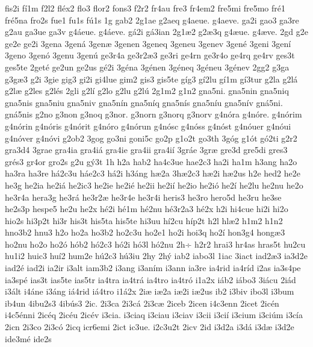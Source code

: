 {fis2i
f^^ed1m
f2l2
fl^^e9x2
flo3
flor2
fons3
f2r2
fr4au
fre3
fr4em2
fre5mi
fre5mo
fr^^e91
fr^^e95na
fro2s
fue1
fu1s
f^^fa1s
1g
gab2
2g1ae
g2aeq
g4aeue.
g4aeve.
ga2i
gao3
ga3re
g2au
ga3ue
ga3v
g4^^e1eue.
g4^^e1eve.
g^^e12i
g^^e13ian
2g1^^e62
g2^^e63q
g4^^e6ue.
g4^^e6ve.
2gd
g2e
ge2e
ge2i
3gena
3gen^^e1
3gen^^e6
3genen
3geneq
3geneu
3genev
3gen^^e9
3geni
3gen^^ed
3geno
3gen^^f3
3genu
3gen^^fa
ge3r4a
ge3r2^^e63
ge3ri
ge4rn
ge3r4o
ge4rq
ge4rv
ges3t
ges5te
2get^^e9
ge2un
ge2us
g^^e92i
3g^^e9na
3g^^e9nen
3g^^e9neq
3g^^e9neu
3g^^e9nev
2gg2
g3ga
g3g^^e63
g2i
3gie
gig3
gi2i
gi4lue
gim2
gis3
gis5te
g^^edg3
g^^ed2lu
g^^ed1m
g^^ed3tur
g2la
g2l^^e1
g2l^^e6
g2les
g2l^^e9s
2gli
g2l^^ed
g2lo
g2lu
g2l^^fa
2g1m2
g1n2
gna5ni.
gna5nin
gna5niq
gna5nis
gna5niu
gna5niv
gna5n^^edn
gna5n^^edq
gna5n^^eds
gna5n^^edu
gna5n^^edv
gn^^e15ni.
gn^^e15nis
g2no
g3non
g3noq
g3nor.
g3norn
g3norq
g3norv
g4n^^f3ra
g4n^^f3re.
g4n^^f3rim
g4n^^f3rin
g4n^^f3ris
g4n^^f3rit
g4n^^f3ro
g4n^^f3run
g4n^^f3sc
g4n^^f3ss
g4n^^f3st
g4n^^f3uer
g4n^^f3ui
g4n^^f3ver
g4n^^f3vi
g2ob2
3gog
go3ni
goni5c
go2p
g1o2t
go3th
3g^^f3g
g1^^f3t
g^^f32ti
g2r2
gra3d4
3grae
gra4ia
gra4i^^e1
gra4ie
gra4ii
gra4i^^ed
3gr^^e1e
3gr^^e6
gre3d
gre5di
gres3
gr^^e9s3
gr4or
gro2s
g2u
g^^fd3t
1h
h2a
hab2
ha4c3ue
hae2c3
ha2i
ha1m
h3ang
ha2o
ha3ra
ha3re
h^^e12c3u
h^^e1e2c3
h^^e12i
h3^^e1ng
h^^e62a
3h^^e62c3
h^^e62i
h^^e62us
h2e
hed2
he2e
he3g
he2ia
he2i^^e1
he2ic3
he2ie
he2i^^e9
he2ii
he2i^^ed
he2io
he2i^^f3
he2^^ed
he2lu
he2nu
he2o
he3r4a
hera3g
he3r^^e1
he3r2^^e6
he3r4e
he3r4i
heris3
he3ro
hero5d
he3ru
he3se
he2s3p
hespe5
he2u
he2x
h^^e92i
h^^e91m
h^^e92nu
h^^e93r2a3
h^^e92x
h2i
hi4cue
hi2i
hi2o
hio2s
hi3p2t
hi3r
his3t
his5ta
his5te
hi3uu
h^^ed2cu
h^^edp2t
h2l
hl^^e62
h1m2
h1n2
hno3b2
hnu3
h2o
ho2a
ho3b2
ho2c3u
ho2e1
ho2i
hoi3q
ho2^^ed
hon3g4
hong^^e63
ho2nu
ho2o
ho2^^f3
h^^f3b2
h^^f32c3
h^^f32i
h^^f33l
h^^f32nu
2h^^f7
h2r2
hrai3
hr4as
hras5t
hu2cu
hu1i2
huic3
hu^^ed2
hum2e
h^^fa2c3
h^^fa3iu
2hy
2h^^fd
iab2
iabo3l
1iac
3iact
iad2^^e63
ia3d2e
iad2^^e9
iad2i
ia2ir
i3alt
iam3b2
i3ang
i3an^^edm
i3ann
ia3re
ia4rid
ia4r^^edd
i2as
ia3s4pe
ia3sp^^e9
ias3t
ias5te
ias5tr
ia4tra
ia4tr^^e1
ia4tro
ia4tr^^f3
i1a2x
i^^e1b2
i^^e1bo3
3i^^e1cu
2i^^e1d
i3^^e1lt
i4^^e1ne
i3^^e1ng
i^^e14rid
i^^e14tro
i1^^e12x
2i^^e6
i^^e62a
i^^e62i
i^^e62us
ib2
i3biv
ibo3l
i3bum
ib4un
4ibu2s3
4ib^^fas3
2ic.
2i3ca
2i3c^^e1
2i3c^^e6
2iceb
2icen
i4c3enn
2icet
2ic^^e9n
i4c5^^e9nni
2ic^^e9q
2ic^^e9u
2ic^^e9v
i3cia.
i3ciaq
i3ciau
i3ciav
i3cii
i3ci^^ed
i3cium
i3ci^^fam
i3c^^eda
2icn
2i3co
2i3c^^f3
2icq
icr6emi
2ict
ic3ue.
i2c3u2t
2icv
2id
i3d2a
i3d^^e1
i3d^^e6
i3d2e
ide3m^^e9
ide2s
}
